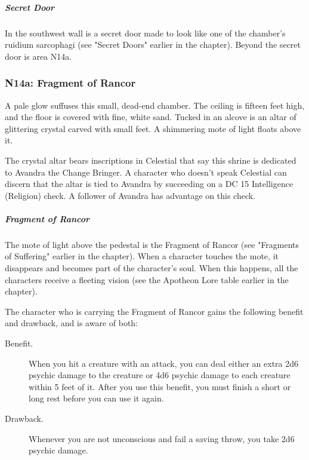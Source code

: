 \documentclass[10pt,a4paper,twoside,fancy,bg=print,twocolumn,openany,nodeprecatedcode]{dndbook}
\begin{document}
\subparagraph{Secret Door}
In the southwest wall is a secret door made to look like one of the chamber's ruidium sarcophagi (see "Secret Doors" earlier in the chapter). Beyond the secret door is area N14a.

\subsubsection{N14a: Fragment of Rancor}
\begin{DndReadAloud}{}
A pale glow suffuses this small, dead-end chamber. The ceiling is fifteen feet high, and the floor is covered with fine, white sand. Tucked in an alcove is an altar of glittering crystal carved with small feet. A shimmering mote of light floats above it.

\end{DndReadAloud}

The crystal altar bears inscriptions in Celestial that say this shrine is dedicated to Avandra the Change Bringer. A character who doesn't speak Celestial can discern that the altar is tied to Avandra by succeeding on a DC 15 Intelligence (Religion) check. A follower of Avandra has advantage on this check.

\subparagraph{Fragment of Rancor}
The mote of light above the pedestal is the Fragment of Rancor (see "Fragments of Suffering" earlier in the chapter). When a character touches the mote, it disappears and becomes part of the character's soul. When this happens, all the characters receive a fleeting vision (see the Apotheon Lore table earlier in the chapter).

The character who is carrying the Fragment of Rancor gains the following benefit and drawback, and is aware of both:

\begin{DndSidebar}[float=!b]{}

\begin{description}
\item[Benefit.]
When you hit a creature with an attack, you can deal either an extra 2d6 psychic damage to the creature or 4d6 psychic damage to each creature within 5 feet of it. After you use this benefit, you must finish a short or long rest before you can use it again.
\item[Drawback.]
Whenever you are not unconscious and fail a saving throw, you take 2d6 psychic damage.
\end{description}



\end{DndSidebar}
\end{document}
